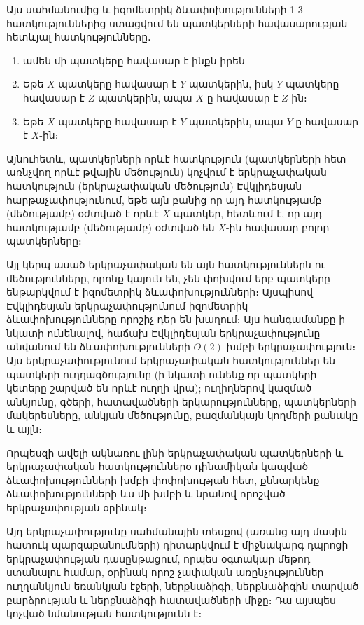 \documentclass[./main.tex]{subfiles}
\begin{document}
\par Այս սահմանումից և իզոմետրիկ ձևափոխությունների 1-3 հատկություններից ստացվում են պատկերների հավասարության հետևյալ հատկությունները․
\begin{enumerate}
    \item [1'.] ամեն մի պատկերը հավասար է ինքն իրեն %
    \item [2'.] Եթե $X$ պատկերը հավասար է $Y$ պատկերին, իսկ $Y$ պատկերը հավասար է $Z$ պատկերին, ապա $X$-ը հավասար է $Z$-ին։
    \item [3'.] Եթե $X$ պատկերը հավասար է $Y$ պատկերին, ապա $Y$-ը հավասար է $X$-ին։
\end{enumerate}
 
\par Այնուհետև, պատկերների որևէ հատկություն (պատկերների հետ առնչվող որևէ թվային մեծություն) կոչվում է երկրաչափական հատկություն (երկրաչափական մեծություն) Էվկլիդեսյան 
հարթաչափությունում, եթե այն բանից որ այդ հատկությամբ (մեծությամբ) օժտված է որևէ $X$ պատկեր, հետևում է, որ այդ հատկությամբ (մեծությամբ) օժտված են $X$-ին հավասար բոլոր պատկերները։ 

\par Այլ կերպ ասած երկրաչափական են այն հատկություններն ու մեծությունները, որոնք կայուն են, չեն փոխվում երբ պատկերը ենթարկվում է իզոմետրիկ ձևափոխությունների։ 
Այսպիսով Էվկլիդեսյան երկրաչափությունում իզոմետրիկ ձևափոխությունները որոշիչ դեր են խաղում։ Այս հանգամանքը ի նկատի ունենալով, հաճախ Էվկլիդեսյան երկրաչափությունը 
անվանում են ձևափոխությունների $O(2)$ խմբի երկրաչափություն։ Այս երկրաչափությունում երկրաչափական հատկություններ են պատկերի ուղղագծությունը (ի նկատի ունենք որ պատկերի կետերը շարված են որևէ ուղղի վրա); 
ուղիղներով կազմած անկյունը, գծերի, հատավածների երկարությունները, պատկերների մակերեսները, անկյան մեծությունը, բազմանկայն կողմերի քանակը և այլն։


\par Որպեսզի ավելի ակնառու լինի երկրաչափական պատկերների և երկրաչափական հատկություններօ դինամիկան կապված ձևափոխությունների խմբի փոփոխության հետ,
քննարկենք ձևափոխությունների ևս մի խմբի և նրանով որոշված երկրաչափության օրինակ։ 

\par Այդ երկրաչափությունը սահմանային տեսքով (առանց այդ մասին հատուկ պարզաբանումների) դիտարկվում է միջնակարգ դպրոցի երկրաչափության դասընթացում,
որպես օգտակար մեթոդ ստանալու համար, օրինակ որոշ չափական առընչություններ ուղղանկյուն եռանկյան էջերի, ներքնաձիգի, ներքնաձիգին տարված բարձրության և
ներքնաձիգի հատավածների միջը։ Դա այսպես կոչված նմանության հատկությունն է։ 
\end{document}
